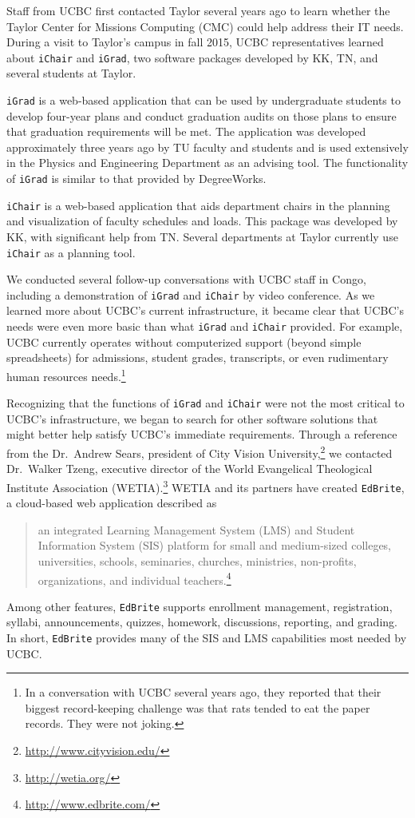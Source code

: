 \documentclass{article}
\newcommand{\igrad}{\texttt{iGrad}}
\newcommand{\ichair}{\texttt{iChair}}
\newcommand{\edbrite}{\texttt{EdBrite}}
\begin{document}
Staff from UCBC first contacted Taylor several years ago to learn
whether the Taylor Center for Missions Computing (CMC) could help
address their IT needs.  During a visit to Taylor's campus in fall
2015, UCBC representatives learned about \ichair{} and \igrad{}, two
software packages developed by KK, TN, and several students at Taylor.

\igrad{} is a web-based application that can be used by undergraduate
students to develop four-year plans and conduct graduation audits on
those plans to ensure that graduation requirements will be met.  The
application was developed approximately three years ago by TU faculty
and students and is used extensively in the Physics and Engineering
Department as an advising tool.  The functionality of \igrad{} is
similar to that provided by DegreeWorks.

\ichair{} is a web-based application that aids department chairs in
the planning and visualization of faculty schedules and loads.  This
package was developed by KK, with significant help from TN.  Several
departments at Taylor currently use \ichair{} as a planning tool.

We conducted several follow-up conversations
with UCBC staff in Congo,
including a demonstration
of \igrad{} and \ichair{}
by video conference.
As we learned more about UCBC's current infrastructure,
it became clear that UCBC's needs
were even more basic than what \igrad{} and \ichair{} provided.
For example, UCBC currently operates
without computerized support
(beyond simple spreadsheets) for
admissions, student grades, transcripts,
or even rudimentary human resources needs.\footnote{In a conversation with UCBC
  several years ago, they reported that their biggest record-keeping challenge
  was that rats tended to eat the paper records. They were not joking.}

Recognizing that the functions of \igrad{} and \ichair{}
were not the most critical to UCBC's infrastructure,
we began to search for other software solutions
that might better help satisfy UCBC's immediate requirements.
Through a reference from the Dr.\ Andrew Sears, president
of City Vision University,\footnote{\url{http://www.cityvision.edu/}}
we contacted Dr.\ Walker Tzeng,
executive director of
the  World Evangelical Theological Institute Association
(WETIA).\footnote{\url{http://wetia.org/}}
WETIA and its partners have created \edbrite,
a cloud-based web application described as
\begin{quote}
  an integrated Learning Management System (LMS)
  and Student Information System (SIS) platform
  for small and medium-sized colleges, universities, schools, seminaries,
  churches, ministries, non-profits, organizations,
  and individual teachers.\footnote{\url{http://www.edbrite.com/}}
\end{quote}
Among other features, \edbrite{} supports
enrollment management,
registration,
syllabi,
announcements,
quizzes,
homework,
discussions,
reporting,
and grading.
In short,
\edbrite{} provides many of
the SIS and LMS capabilities
most needed by UCBC.
\end{document}
